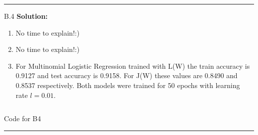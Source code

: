 \documentclass{article}
\newcommand{\1}{\mathbf{1}}
\begin{document}
\noindent\rule{\textwidth}{1pt}
B.4 {\bf Solution:}\\
\begin{enumerate}
    \item No time to explain!:)
    
    
    \item No time to explain!:)
    
    
    \item For Multinomial Logistic Regression trained with L(W) the train accuracy is 0.9127 and test accuracy is 0.9158. For J(W) these values are 0.8490 and 0.8537 respectively. Both models were trained for 50 epochs with learning rate $l = 0.01$. 
\end{enumerate}




\inputminted{python}{code/B4.py}
\caption{Code for B4}

\noindent\rule{\textwidth}{1pt}
\end{document}
